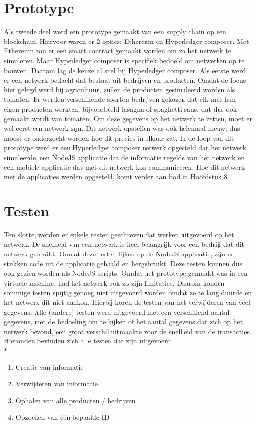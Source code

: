 \section{Prototype}
Als tweede deel werd een prototype gemaakt van een supply chain op een blockchain. Hiervoor waren er 2 opties: Ethereum en Hyperledger composer. Met Ethereum zou er een smart contract gemaakt worden om zo het netwerk te simuleren. Maar Hyperledger composer is specifiek bedoeld om netwerken op te bouwen. Daarom lag de keuze al snel bij Hyperledger composer. Als eerste werd er een netwerk bedacht dat bestaat uit bedrijven en producten. Omdat de focus hier gelegd werd bij agricultuur, zullen de producten gesimuleerd worden als tomaten. Er werden verschillende soorten bedrijven gekozen dat elk met hun eigen producten werkten, bijvoorbeeld lasagna of spaghetti saus, dat dus ook gemaakt wordt van tomaten. Om deze gegevens op het netwerk te zetten, moet er wel eerst een netwerk zijn. Dit netwerk opstellen was ook helemaal nieuw, dus moest er onderzocht worden hoe dit precies in elkaar zat. In de loop van dit prototype werd er een Hyperledger composer netwerk opgesteld dat het netwerk simuleerde, een NodeJS applicatie dat de informatie regelde van het netwerk en een mobiele applicatie dat met dit netwerk kon communiceren. Hoe dit netwerk met de applicaties werden opgesteld, komt verder aan bod in Hoofdstuk 8.

\section{Testen}
Ten slotte, werden er enkele testen geschreven dat werken uitgevoerd op het netwerk. De snelheid van een netwerk is heel belangrijk voor een bedrijf dat dit netwerk gebruikt. Omdat deze testen lijken op de NodeJS applicatie, zijn er stukken code uit de applicatie gehaald en hergebruikt. Deze testen kunnen dus ook gezien worden als NodeJS scripts. Omdat het prototype gemaakt was in een virtuele machine, had het netwerk ook zo zijn limitaties. Daarom konden sommige testen spijtig genoeg niet uitgevoerd worden omdat ze te lang duurde en het netwerk dit niet aankon. Hierbij horen de testen van het verwijderen van veel gegevens. Alle (andere) testen werd uitgevoerd met een verschillend aantal gegevens, met de bedoeling om te kijken of het aantal gegevens dat zich op het netwerk bevond, een groot verschil uitmaakte voor de snelheid van de transacties. Hieronden bevinden zich alle testen dat zijn uitgevoerd:\\*
\begin{enumerate}
	\item Creatie van informatie
	\item Verwijderen van informatie
	\item Ophalen van alle producten / bedrijven
	\item Opzoeken van één bepaalde ID
\end{enumerate}

